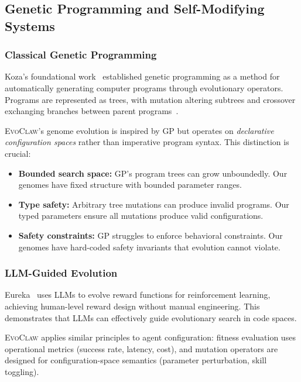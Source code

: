 \documentclass{article}
\newcommand{\evoclaw}{\textsc{EvoClaw}}
\begin{document}
\subsection{Genetic Programming and Self-Modifying Systems}

\subsubsection{Classical Genetic Programming}

Koza's foundational work~\cite{koza1992gp} established genetic programming as a method for automatically generating computer programs through evolutionary operators. Programs are represented as trees, with mutation altering subtrees and crossover exchanging branches between parent programs~\cite{angeline1994genetic}.

\evoclaw{}'s genome evolution is inspired by GP but operates on \textit{declarative configuration spaces} rather than imperative program syntax. This distinction is crucial:

\begin{itemize}[leftmargin=*]
    \item \textbf{Bounded search space:} GP's program trees can grow unboundedly. Our genomes have fixed structure with bounded parameter ranges.
    
    \item \textbf{Type safety:} Arbitrary tree mutations can produce invalid programs. Our typed parameters ensure all mutations produce valid configurations.
    
    \item \textbf{Safety constraints:} GP struggles to enforce behavioral constraints. Our genomes have hard-coded safety invariants that evolution cannot violate.
\end{itemize}

\subsubsection{LLM-Guided Evolution}

Eureka~\cite{ma2023eureka} uses LLMs to evolve reward functions for reinforcement learning, achieving human-level reward design without manual engineering. This demonstrates that LLMs can effectively guide evolutionary search in code spaces.

\evoclaw{} applies similar principles to agent configuration: fitness evaluation uses operational metrics (success rate, latency, cost), and mutation operators are designed for configuration-space semantics (parameter perturbation, skill toggling).
\end{document}
